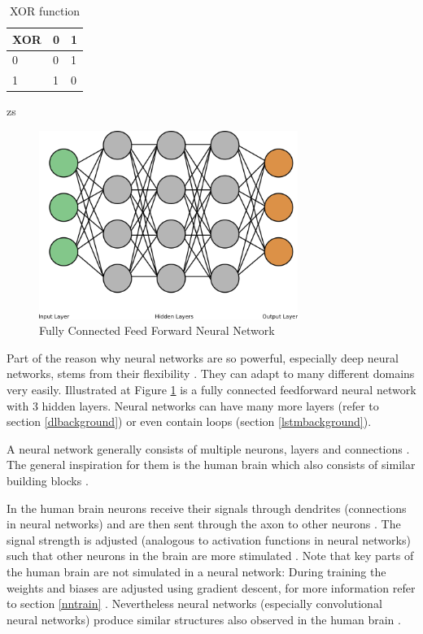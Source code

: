 \documentclass[draft,final,oneside]{vutinfth} %
\begin{document}
\begin{table}[]
\centering
\begin{tabular}{|l|l|l|}
\hline
XOR & 0 & 1 \\ \hline
0   & 0 & 1 \\ \hline
1   & 1 & 0 \\ \hline
\end{tabular}
\caption{XOR function}
\label{xor}zs
\end{table}


\begin{figure}[ht]
	\centering
  	\includegraphics[width=0.75\textwidth]{graphics/simple_neural_network.png}
	\caption{Fully Connected Feed Forward Neural Network}
	\label{fig:feedforward}
\end{figure}

Part of the reason why neural networks are so powerful, especially deep neural networks, stems from their flexibility \cite{selfdriving}\cite{speech}\cite{nmt}. They can adapt to many different domains very easily. Illustrated at Figure \ref{fig:feedforward} is a fully connected feedforward neural network with 3 hidden layers. Neural networks can have many more layers (refer to section \ref{dlbackground}) or even contain loops (section \ref{lstmbackground}).

A neural network generally consists of multiple neurons, layers and connections \cite{aimodern}. The general inspiration for them is the human brain which also consists of similar building blocks \cite{anintroductiontoneuralnetworks}.

In the human brain neurons receive their signals through dendrites (connections in neural networks) and are then sent through the axon to other neurons \cite{anintroductiontoneuralnetworks}. The signal strength is adjusted (analogous to activation functions in neural networks) such that other neurons in the brain are more stimulated \cite{anintroductiontoneuralnetworks}. Note that key parts of the human brain are not simulated in a neural network: During training the weights and biases are adjusted using gradient descent, for more information refer to section \ref{nntrain} \cite{recentexcitementabotuneuralnetworks}. Nevertheless neural networks (especially convolutional neural networks) produce similar structures also observed in the human brain \cite{Cichy2016}.
\end{document}
